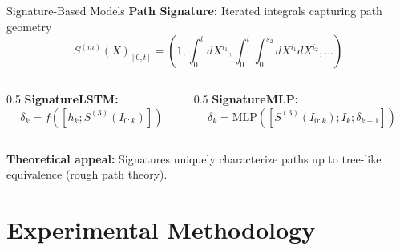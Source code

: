 \documentclass[aspectratio=169,11pt]{beamer}
\begin{document}
\begin{frame}{Signature-Based Models}
\textbf{Path Signature:} Iterated integrals capturing path geometry
\begin{equation*}
S^{(m)}(X)_{[0,t]} = \left(1, \int_0^t dX^{i_1}, \int_0^t \int_0^{s_2} dX^{i_1} dX^{i_2}, \ldots\right)
\end{equation*}

\vspace{0.3cm}
\begin{columns}
\begin{column}{0.5\textwidth}
\textbf{SignatureLSTM:}
\begin{equation*}
\delta_k = f([h_k; S^{(3)}(I_{0:k})])
\end{equation*}
\end{column}
\begin{column}{0.5\textwidth}
\textbf{SignatureMLP:}
\begin{equation*}
\delta_k = \text{MLP}([S^{(3)}(I_{0:k}); I_k; \delta_{k-1}])
\end{equation*}
\end{column}
\end{columns}

\vspace{0.3cm}
\textbf{Theoretical appeal:} Signatures uniquely characterize paths up to tree-like equivalence (rough path theory).
\end{frame}

\section{Experimental Methodology}
\end{document}
